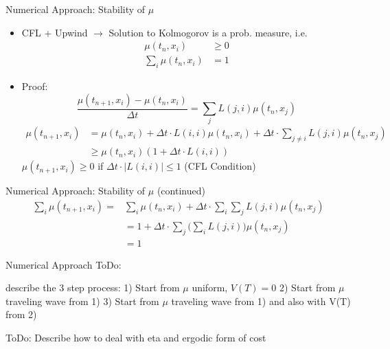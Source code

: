 \documentclass{beamer}
\begin{document}
\begin{frame}{Numerical Approach: Stability of $\mu$}
		\begin{itemize}
			\item CFL + Upwind $\rightarrow$ Solution to Kolmogorov is a prob. measure, i.e.
			\begin{equation}
			\begin{split}
			\mu(t_n,x_i) & \geq 0 \\
			\sum_i \mu(t_n,x_i) &= 1
			\end{split}
			\end{equation}
			\item Proof:
			\begin{equation}
			\frac{\mu(t_{n+1},x_i)-\mu(t_{n},x_i)}{\Delta t}=\sum_{j} L(j,i) \mu(t_n,x_j)
			\end{equation}
			\begin{equation}
			\begin{split}
			\mu(t_{n+1},x_i)&=\mu(t_{n},x_i)+ \Delta t \cdot L(i,i)\mu(t_n,x_i) + \Delta t \cdot \sum_{j\neq i} L(j,i) \mu(t_n,x_j)  \\
			& \geq \mu(t_{n},x_i) (1+ \Delta t \cdot L(i,i))
			\end{split}
			\end{equation}
			$\mu(t_{n+1},x_i) \geq 0$ if $\Delta t \cdot| L(i,i)| \leq 1$ (CFL Condition)
		\end{itemize}
\end{frame}
	
\begin{frame}{Numerical Approach: Stability of $\mu$ (continued)}
		\begin{equation}
		\begin{split}
		\sum_i \mu(t_{n+1},x_i)=& \sum_i \mu(t_{n},x_i)+\Delta t \cdot \sum_i \sum_{j} L(j,i) \mu(t_n,x_j) \\
		& = 1 + \Delta t \cdot \sum_j \Big(\sum_i L(j,i)\Big) \mu(t_n,x_j) \\
		& = 1
		\end{split}
		\end{equation}
\end{frame}
	
\begin{frame}{Numerical Approach}
ToDo:

describe the 3 step process:
1) Start from $\mu$ uniform, $V(T)=0$
2) Start from $\mu$ traveling wave from 1)
3) Start from $\mu$ traveling wave from 1) and also with V(T) from 2)


ToDo:
Describe how to deal with eta and ergodic form of cost
\end{frame}
\end{document}
